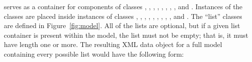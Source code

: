 \Model serves as a container for components of classes
\FunctionDefinition, \UnitDefinition, \Compartment, \Species, \Parameter,
\InitialAssignment, \Rule, \Constraint, \Reaction and \Event.
Instances of the classes are placed inside instances of classes
\ListOfFunctionDefinitions, \ListOfUnitDefinitions,
\ListOfCompartments, \ListOfSpecies, \ListOfParameters, \ListOfInitialAssignments,
\ListOfRules, \ListOfConstraints, \ListOfReactions, and
\ListOfEvents.  The ``list'' classes are defined in
Figure~\ref{fig:model}.  All of the lists are optional, but if a
given list container is present within the model, the list must
not be empty; that is, it must have length one or more.  The
resulting XML data object for a full model containing every
possible list would have the following form:

\newcommand{\sayOptional}{\raisebox{0pt}[0pt][0pt]{\bigg\} \textrm{\emph{optional}}}}

